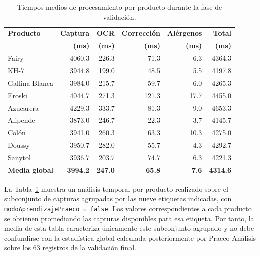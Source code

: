 \begin{table}[htbp]
	\centering
	\caption{Tiempos medios de procesamiento por producto durante la fase de validación.}
	\label{tab:tiempos-productos}
	\renewcommand{\arraystretch}{1.20}
	\setlength{\tabcolsep}{5pt}
	
	\begin{tabular}{lrrrrr}
		\toprule
		\textbf{Producto} &
		\textbf{Captura} &
		\textbf{OCR} &
		\textbf{Corrección} &
		\textbf{Alérgenos} &
		\textbf{Total} \\
		& \textbf{(ms)} & \textbf{(ms)} & \textbf{(ms)}
		& \textbf{(ms)} & \textbf{(ms)} \\
		\midrule
		
		Fairy          & 4060.3 & 226.3 & 71.3  & 6.3  & 4364.3 \\
		KH-7           & 3944.8 & 199.0 & 48.5  & 5.5  & 4197.8 \\
		Gallina Blanca & 3984.0 & 215.7 & 59.7  & 6.0  & 4265.3 \\
		Eroski         & 4044.7 & 271.3 & 121.3 & 17.7 & 4455.0 \\
		Azucarera      & 4229.3 & 333.7 & 81.3  & 9.0  & 4653.3 \\
		Alipende       & 3873.0 & 246.7 & 22.3  & 3.7  & 4145.7 \\
		Colón          & 3941.0 & 260.3 & 63.3  & 10.3 & 4275.0 \\
		Doussy         & 3950.7 & 282.0 & 55.7  & 4.3  & 4292.7 \\
		Sanytol        & 3936.7 & 203.7 & 74.7  & 6.3  & 4221.3 \\
		
		\midrule
		\textbf{Media global} &
		\textbf{3994.2} &
		\textbf{247.0} &
		\textbf{65.8} &
		\textbf{7.6} &
		\textbf{4314.6} \\
		
		\bottomrule
	\end{tabular}
\end{table}


La Tabla~\ref{tab:tiempos-productos} muestra un análisis temporal por producto realizado sobre el subconjunto de capturas agrupadas por las nueve etiquetas indicadas, con \texttt{modoAprendizajePraeco = false}. Los valores correspondientes a cada producto se obtienen promediando las capturas disponibles para esa etiqueta. Por tanto, la media de esta tabla caracteriza únicamente este subconjunto agrupado y no debe confundirse con la estadística global calculada posteriormente por Praeco Análisis sobre los 63 registros de la validación final.

